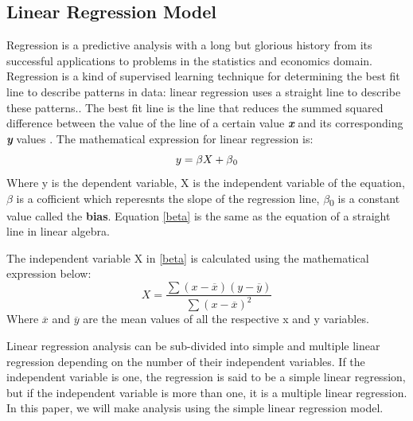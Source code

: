 \documentclass[conference]{IEEEtran}
\begin{document}
\subsection{Linear Regression Model}
Regression 
is a predictive analysis with a long but glorious history from its successful applications to problems in the statistics and economics domain. Regression is a kind of supervised learning technique for determining the best fit line to describe patterns in data: linear regression uses a straight line to describe these patterns.\cite{theobald2017machine}. The best fit line is the line that reduces the summed squared difference between the value of the line of a certain value \textbf{\textit{x}} and its corresponding \textbf{\textit{y}} values \cite{massaron2016regression}. The mathematical expression for linear regression is:
	\begin{equation}
		y = \beta\label{beta}X + \beta\textsubscript{0}
	\end{equation}
	Where y is the dependent variable, X is the independent variable of the equation, $\beta$ is a cofficient which reperesnts the slope of the regression line, $\beta$\textsubscript{0} is a constant value called the \textbf{bias}. Equation \eqref{beta} is the same as the equation of a straight line in linear algebra.
	
	The independent variable X in \eqref{beta} is calculated using the mathematical expression below:
	\begin{equation}
		X = \frac{\sum{}(x-\overline{x})(y-\overline{y})}{\sum{}(x-\overline{x})^2}
	\end{equation}	
	Where $\overline{x}$ and $\overline{y}$ are the mean values of all the respective x and y variables.
	
	
Linear regression analysis can be sub-divided into simple and multiple linear regression depending on the number of their independent variables. If the independent variable is one, the regression is said to be a simple linear regression, but if the independent variable is more than one, it is a multiple linear regression. In this paper, we will make analysis using the simple linear regression model.
\end{document}
